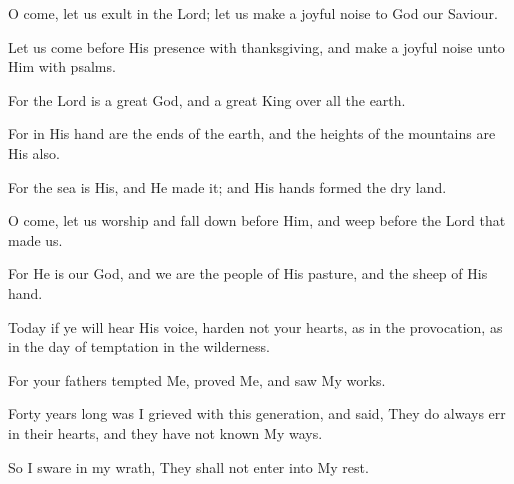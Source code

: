 O come, let us exult in the Lord; let us make a joyful noise to God our Saviour.

Let us come before His presence with thanksgiving, and make a joyful noise unto Him with psalms.

For the Lord is a great God, and a great King over all the earth.

For in His hand are the ends of the earth, and the heights of the mountains are His also.

For the sea is His, and He made it; and His hands formed the dry land.

O come, let us worship and fall down before Him, and weep before the Lord that made us.

For He is our God, and we are the people of His pasture, and the sheep of His hand.

Today if ye will hear His voice, harden not your hearts, as in the provocation, as in the day of temptation in the wilderness.

For your fathers tempted Me, proved Me, and saw My works.

Forty years long was I grieved with this generation, and said, They do always err in their hearts, and they have not known My ways.

So I sware in my wrath, They shall not enter into My rest.
